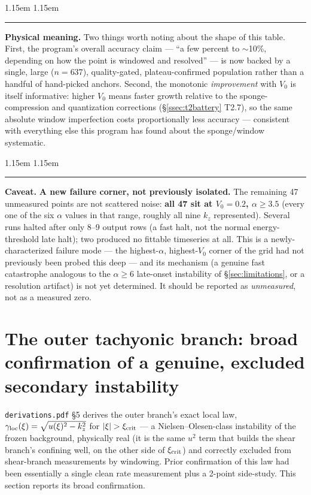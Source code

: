 \documentclass[11pt,a4paper]{article}
\numberwithin{equation}{section}
\theoremstyle{remark}
\newenvironment{physmeaning}%
{\par\medskip\noindent
 \begin{list}{}{\leftmargin 1.15em \rightmargin 1.15em \listparindent 0pt
 \itemindent 0pt \parsep 2pt \topsep 2pt}\item\relax
 \small\textcolor{meancol}{\rule[-0.6ex]{2.6pt}{2.4ex}}\hspace{0.55em}%
 \textcolor{meancol}{\textbf{Physical meaning.}}\hspace{0.5em}\ignorespaces}%
{\end{list}\medskip}
\newenvironment{caveat}%
{\par\medskip\noindent
 \begin{list}{}{\leftmargin 1.15em \rightmargin 1.15em \listparindent 0pt
 \itemindent 0pt \parsep 2pt \topsep 2pt}\item\relax
 \small\textcolor{red!55!black}{\rule[-0.6ex]{2.6pt}{2.4ex}}\hspace{0.55em}%
 \textcolor{red!55!black}{\textbf{Caveat.}}\hspace{0.5em}\ignorespaces}%
{\end{list}\medskip}
\newcommand{\Vo}{V_0}
\newcommand{\kz}{k_z}
\begin{document}
\begin{physmeaning}
Two things worth noting about the shape of this table. First, the
program's overall accuracy claim --- ``a few percent to $\sim$10\%,
depending on how the point is windowed and resolved'' --- is now backed
by a single, large ($n=637$), quality-gated, plateau-confirmed population
rather than a handful of hand-picked anchors. Second, the monotonic
\emph{improvement} with $V_0$ is itself informative: higher $\Vo$ means
faster growth relative to the sponge-compression and quantization
corrections (\S\ref{ssec:t2battery} T2.7), so the same absolute window
imperfection costs proportionally less accuracy --- consistent with
everything else this program has found about the sponge/window systematic.
\end{physmeaning}

\begin{caveat}
\textbf{A new failure corner, not previously isolated.} The remaining 47
unmeasured points are not scattered noise: \textbf{all 47 sit at
$\Vo=0.2$, $\alpha\ge3.5$} (every one of the six $\alpha$ values in that
range, roughly all nine $\kz$ represented). Several runs halted after
only 8--9 output rows (a fast halt, not the normal energy-threshold late
halt); two produced no fittable timeseries at all. This is a
newly-characterized failure mode --- the highest-$\alpha$, highest-$\Vo$
corner of the grid had not previously been probed this deep --- and its
mechanism (a genuine fast catastrophe analogous to the $\alpha\ge6$
late-onset instability of \S\ref{sec:limitations}, or a resolution
artifact) is not yet determined. It should be reported as \emph{unmeasured},
not as a measured zero.
\end{caveat}

\section{The outer tachyonic branch: broad confirmation of a genuine,
excluded secondary instability}
\label{sec:tachyon}

\texttt{derivations.pdf} \S5 derives the outer branch's exact local law,
$\gamma_{\rm loc}(\xi)=\sqrt{u(\xi)^2-\kz^2}$ for $|\xi|>\xi_{\rm crit}$ ---
a Nielsen--Olesen-class instability of the frozen background, physically
real (it is the same $u^2$ term that builds the shear branch's confining
well, on the other side of $\xi_{\rm crit}$) and correctly excluded from
shear-branch measurements by windowing. Prior confirmation of this law
had been essentially a single clean rate measurement plus a 2-point
side-study. This section reports its broad confirmation.
\end{document}
